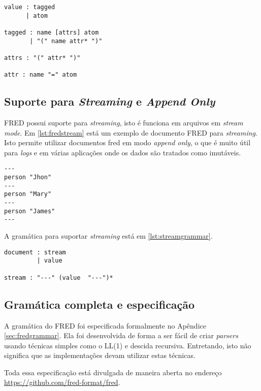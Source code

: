 \begin{lstlisting}[caption=Gramática para tags e metadados,label={lst:taggrammar}]
value : tagged
      | atom

tagged : name [attrs] atom
       | "(" name attr* ")" 

attrs : "(" attr* ")"

attr : name "=" atom
\end{lstlisting}

\subsection{Suporte para \textit{Streaming} e \textit{Append Only}}

FRED possui suporte para \textit{streaming}, isto é funciona em 
arquivos em \textit{stream mode}. Em \ref{lst:fredstream} está
um exemplo de documento FRED para \textit{streaming}. Isto permite
utilizar documentos fred em modo \textit{append only}, o que é muito útil
para \textit{logs} e em várias aplicações onde os dados são tratados como imutáveis.

\begin{lstlisting}[caption=Exemplo de documento com streaming em FRED,label={lst:fredstream}]
---
person "Jhon"
---
person "Mary"
---
person "James"
---
\end{lstlisting}

A gramática para suportar \textit{streaming} está em \ref{lst:streamgrammar}.

\begin{lstlisting}[caption=Gramática para streaming,label={lst:streamgrammar}]
document : stream
         | value

stream : "---" (value  "---")*
\end{lstlisting}

\subsection{Gramática completa e especificação}

A gramática do FRED foi especificada formalmente no Apêndice \ref{sec:fredgrammar}.
Ela foi desenvolvida de forma a ser fácil de criar \textit{parsers} usando técnicas 
simples como o LL(1) e descida recursiva. Entretando, isto não significa que as implementações
devam utilizar estas técnicas.

Toda essa especificação está divulgada de maneira aberta no 
endereço \url{https://github.com/fred-format/fred}.
 
